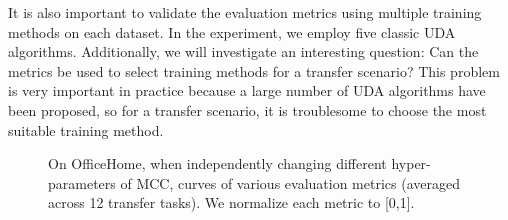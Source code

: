 \documentclass{article} %
\begin{document}
It is also important to validate the evaluation metrics using multiple training methods on each dataset. 
In the experiment, we employ five classic UDA algorithms. 
Additionally, we will investigate an interesting question: Can the metrics be used to select training methods for a transfer scenario? This problem is very important in practice because a large number of UDA algorithms have been proposed, so for a transfer scenario, it is troublesome to choose the most suitable training method. 



\begin{figure}[t]
\vspace{-6mm}
	\centering
	\caption{On OfficeHome, when independently changing different hyper-parameters of MCC, curves of various evaluation metrics (averaged across 12 transfer tasks). We normalize each metric to [0,1]. }
	\label{fig:conclusion-hyperparameter}
\vspace{-2mm}
\end{figure}
\end{document}
